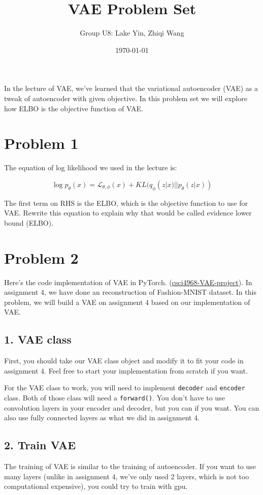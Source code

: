 \documentclass{article}
\begin{document}
\title{\vspace{-3cm}VAE Problem Set}
\author{Group U8: Lake Yin, Zhiqi Wang}
\date{\today}
\maketitle

In the lecture of VAE, we've learned that the variational autoencoder (VAE) as a tweak of autoencoder with given objective. In this problem set we will explore how ELBO is the objective function of VAE.



\section*{Problem 1}

The equation of log likelihood we used in the lecture is:

 $$\log p_\theta (x) = \mathcal{L}_{\theta, \phi}(x) + KL(q_\phi(z|x)||p_\theta(z|x))$$

The first term on RHS is the ELBO, which is the objective function to use for VAE. Rewrite this equation to explain why that would be called evidence lower bound (ELBO).


\section*{Problem 2}

Here's the code implementation of VAE in PyTorch. (\href{https://github.com/ZhiqiEliWang/csci4968-VAE-project}{csci4968-VAE-project}). In assignment 4, we have done an reconstruction of Fashion-MNIST dataset. In this problem, we will build a VAE on assignment 4 based on our implementation of VAE.


\subsection*{1. VAE class}
First, you should take our VAE class object and modify it to fit your code in assignment 4. Feel free to start your implementation from scratch if you want. 

For the VAE class to work, you will need to implement \texttt{decoder} and \texttt{encoder} class. Both of those class will need a \texttt{forward()}. You don't have to use convolution layers in your encoder and decoder, but you can if you want. You can also use fully connected layers as what we did in assignment 4.

\subsection*{2. Train VAE}
The training of VAE is similar to the training of autoencoder. If you want to use many layers (unlike in assignment 4, we've only used 2 layers, which is not too computational expensive), you could try to train with gpu.
\end{document}
